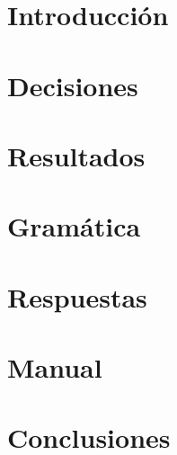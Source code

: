 \documentclass[11pt, a4paper]{article}
\begin{document}


\maketitle
\newpage
\tableofcontents
\newpage

\section{Introducción}


\section{Decisiones}


\section{Resultados}


\section{Gramática}


\section{Respuestas}


\section{Manual}


\section{Conclusiones}

\end{document}
